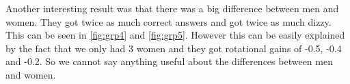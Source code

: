 Another interesting result was that there was a big difference between men and women. 
They got twice as much correct answers and got twice as much dizzy.
This can be seen in \ref{fig:grp4} and \ref{fig:grp5}. 
However this can be easily explained by the fact that we only had 3 women and they got rotational gains of -0.5, -0.4 and -0.2. 
So we cannot say anything useful about the differences between men and women. 
